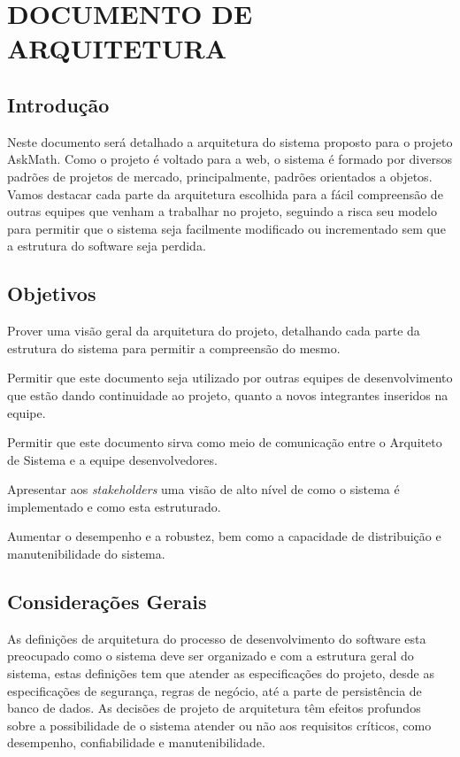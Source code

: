 \newpage
\chapter{DOCUMENTO DE ARQUITETURA}\label{apendice_arquitetura}

\section{Introdução}
Neste documento será detalhado a arquitetura do sistema proposto para o projeto 
AskMath. Como o projeto é voltado para a web, o sistema é formado por diversos 
padrões de projetos de mercado, principalmente, padrões orientados a objetos. 
Vamos destacar cada parte da arquitetura escolhida para a fácil compreensão de 
outras equipes que venham a trabalhar no projeto, seguindo a risca seu modelo 
para permitir que o sistema seja facilmente modificado ou incrementado sem que a 
estrutura do software seja perdida.

\section{Objetivos}
\begin{alineascomponto}
	\item Prover uma visão geral da arquitetura do projeto, detalhando cada 
parte da estrutura do sistema para permitir a compreensão do mesmo.
    \item Permitir que este documento seja utilizado por outras equipes de 
desenvolvimento que estão dando continuidade ao projeto, quanto a novos 
integrantes inseridos na equipe.
    \item Permitir que este documento sirva como meio de comunicação entre o 
Arquiteto de Sistema e a equipe desenvolvedores.
    \item Apresentar aos \textit{stakeholders} uma visão de alto nível de como o 
sistema é implementado e como esta estruturado.
    \item Aumentar o desempenho e a robustez, bem como a capacidade de 
distribuição e manutenibilidade do sistema.
\end{alineascomponto}

\section{Considerações Gerais}
As definições de arquitetura do processo de desenvolvimento do software esta 
preocupado como o sistema deve ser organizado e com a estrutura geral do 
sistema, estas definições tem que atender as especificações do projeto, desde as 
especificações de segurança, regras de negócio, até a parte de persistência de 
banco de dados. As decisões de projeto de arquitetura têm efeitos profundos 
sobre a possibilidade de o sistema atender ou não aos requisitos críticos, como 
desempenho, confiabilidade e manutenibilidade.

